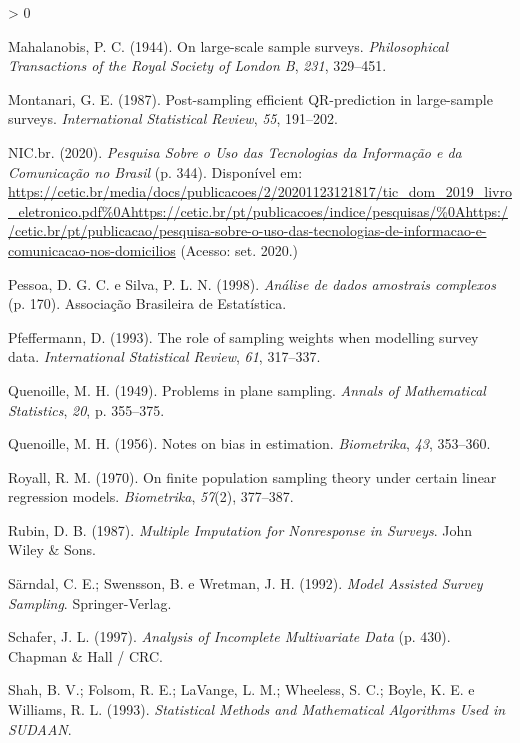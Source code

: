\documentclass[
  12pt,
  brazilian,
]{book}
\newlength{\cslhangindent}
\newenvironment{CSLReferences}[2] %
 {%
  \setlength{\parindent}{0pt}
  \ifodd #1 \everypar{\setlength{\hangindent}{\cslhangindent}}\ignorespaces\fi
  \ifnum #2 > 0
  \setlength{\parskip}{#2\baselineskip}
  \fi
 }%
 {}
\theoremstyle{definition}
\theoremstyle{definition}
\theoremstyle{definition}
\theoremstyle{definition}
\theoremstyle{remark}
\begin{document}
\begin{CSLReferences}{1}{0}
\leavevmode\hypertarget{ref-Mahala1944}{}%
Mahalanobis, P. C. (1944). On large-scale sample surveys. \emph{Philosophical Transactions of the Royal Society of London B}, \emph{231}, 329--451.

\leavevmode\hypertarget{ref-Mont87}{}%
Montanari, G. E. (1987). Post-sampling efficient {QR-prediction} in large-sample surveys. \emph{International Statistical Review}, \emph{55}, 191--202.

\leavevmode\hypertarget{ref-NICbr2020a}{}%
NIC.br. (2020). \emph{{Pesquisa Sobre o Uso das Tecnologias da Informa{ç}{ã}o e da Comunica{ç}{ã}o no Brasil}} (p. 344). Disponível em: \url{https://cetic.br/media/docs/publicacoes/2/20201123121817/tic_dom_2019_livro_eletronico.pdf\%0Ahttps://cetic.br/pt/publicacoes/indice/pesquisas/\%0Ahttps://cetic.br/pt/publicacao/pesquisa-sobre-o-uso-das-tecnologias-de-informacao-e-comunicacao-nos-domicilios} (Acesso: set. 2020.)

\leavevmode\hypertarget{ref-Pessoa1998}{}%
Pessoa, D. G. C. e Silva, P. L. N. (1998). \emph{{An{á}lise de dados amostrais complexos}} (p. 170). Associa{ç}{ã}o Brasileira de Estat{í}stica.

\leavevmode\hypertarget{ref-Pfeff}{}%
Pfeffermann, D. (1993). The role of sampling weights when modelling survey data. \emph{International Statistical Review}, \emph{61}, 317--337.

\leavevmode\hypertarget{ref-Queno49}{}%
Quenoille, M. H. (1949). Problems in plane sampling. \emph{Annals of Mathematical Statistics}, \emph{20}, p. 355--375.

\leavevmode\hypertarget{ref-Queno56}{}%
Quenoille, M. H. (1956). Notes on bias in estimation. \emph{Biometrika}, \emph{43}, 353--360.

\leavevmode\hypertarget{ref-royall1970}{}%
Royall, R. M. (1970). On finite population sampling theory under certain linear regression models. \emph{Biometrika}, \emph{57}(2), 377--387.

\leavevmode\hypertarget{ref-Rubin87}{}%
Rubin, D. B. (1987). \emph{Multiple Imputation for Nonresponse in Surveys}. John Wiley \& Sons.

\leavevmode\hypertarget{ref-SSW1992}{}%
Särndal, C. E.; Swensson, B. e Wretman, J. H. (1992). \emph{Model Assisted Survey Sampling}. Springer-Verlag.

\leavevmode\hypertarget{ref-Schafer1997}{}%
Schafer, J. L. (1997). \emph{{Analysis of Incomplete Multivariate Data}} (p. 430). Chapman {\&} Hall / CRC.

\leavevmode\hypertarget{ref-Shah1993}{}%
Shah, B. V.; Folsom, R. E.; LaVange, L. M.; Wheeless, S. C.; Boyle, K. E. e Williams, R. L. (1993). \emph{Statistical Methods and Mathematical Algorithms Used in SUDAAN}.


\end{CSLReferences}
\end{document}
